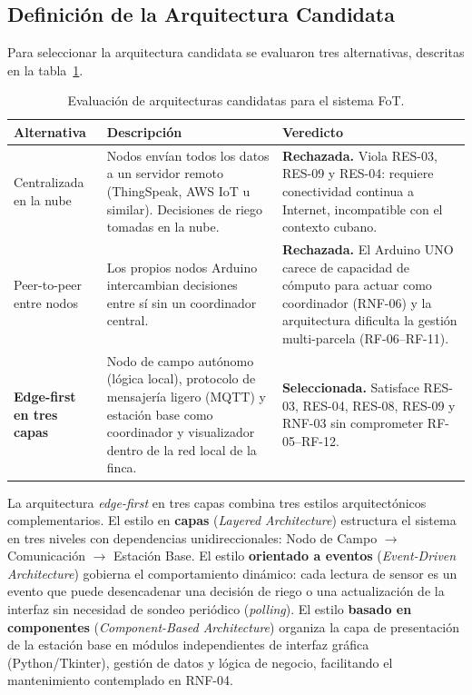 \subsection{Definición de la Arquitectura Candidata}
\label{sec:arq-def}

Para seleccionar la arquitectura candidata se evaluaron tres alternativas,
descritas en la tabla~\ref{tab:arq-candidatas}.

\begin{table}[htbp]
\centering
\caption{Evaluación de arquitecturas candidatas para el sistema FoT.}
\label{tab:arq-candidatas}
\small
\begin{tabular}{|p{3.4cm}|p{5.4cm}|p{4.6cm}|}
\hline
\textbf{Alternativa} & \textbf{Descripción} & \textbf{Veredicto} \\
\hline
Centralizada en la nube
    & Nodos envían todos los datos a un servidor remoto (ThingSpeak, AWS IoT
      u similar). Decisiones de riego tomadas en la nube.
    & \textbf{Rechazada.} Viola RES-03, RES-09 y RES-04: requiere
      conectividad continua a Internet, incompatible con el contexto cubano. \\
\hline
Peer-to-peer entre nodos
    & Los propios nodos Arduino intercambian decisiones entre sí sin un
      coordinador central.
    & \textbf{Rechazada.} El Arduino UNO carece de capacidad de cómputo
      para actuar como coordinador (RNF-06) y la arquitectura dificulta
      la gestión multi-parcela (RF-06--RF-11). \\
\hline
\textbf{Edge-first en tres capas}
    & Nodo de campo autónomo (lógica local), protocolo de mensajería
      ligero (MQTT) y estación base como coordinador y visualizador
      dentro de la red local de la finca.
    & \textbf{Seleccionada.} Satisface RES-03, RES-04, RES-08, RES-09
      y RNF-03 sin comprometer RF-05--RF-12. \\
\hline
\end{tabular}
\end{table}

La arquitectura \textit{edge-first} en tres capas combina tres estilos
arquitectónicos complementarios. El estilo en \textbf{capas} (\textit{Layered
Architecture}) estructura el sistema en tres niveles con dependencias
unidireccionales: Nodo de Campo $\to$ Comunicación $\to$ Estación Base. El
estilo \textbf{orientado a eventos} (\textit{Event-Driven Architecture})
gobierna el comportamiento dinámico: cada lectura de sensor es un evento que
puede desencadenar una decisión de riego o una actualización de la interfaz
sin necesidad de sondeo periódico (\textit{polling}). El estilo
\textbf{basado en componentes} (\textit{Component-Based Architecture})
organiza la capa de presentación de la estación base en módulos
independientes de interfaz gráfica (Python/Tkinter), gestión de datos y
lógica de negocio, facilitando el mantenimiento contemplado en RNF-04.


